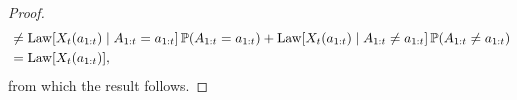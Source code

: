 \begin{proof}
\begin{align*}
        &\neq \mathrm{Law}[X_{t}(a_{1:t}) \mid A_{1:t} = a_{1:t}] \, \mathbb{P}(A_{1:t} = a_{1:t}) + \mathrm{Law}[X_{t}(a_{1:t}) \mid A_{1:t} \neq a_{1:t}] \, \mathbb{P}(A_{1:t} \neq a_{1:t}) \\
        &= \mathrm{Law}[X_{t}(a_{1:t})],
    \end{align*}
    from which the result follows.
\end{proof}


